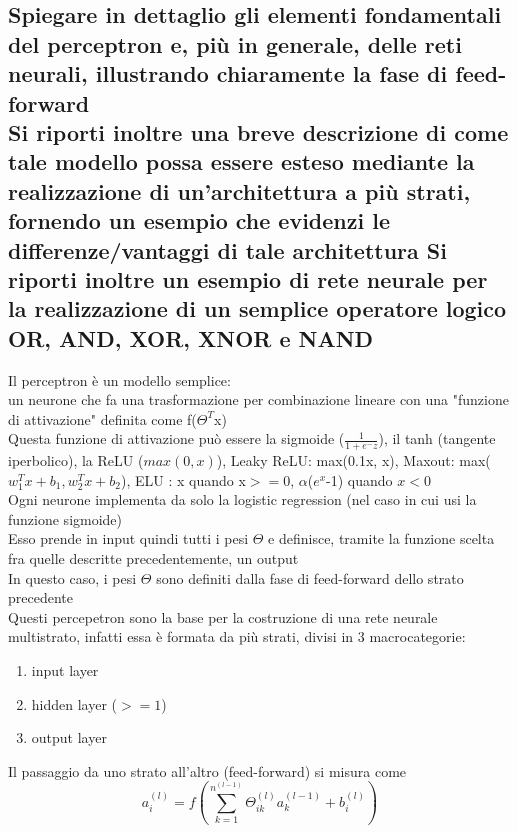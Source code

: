 \documentclass[10pt,oneside,a4paper]{article}
\begin{document}
	
	
	\subsection{Spiegare in dettaglio gli elementi fondamentali del perceptron e, più in generale, delle reti
		neurali, illustrando chiaramente la fase di feed-forward\\
		Si riporti inoltre una breve descrizione di come tale modello possa essere esteso
		mediante la realizzazione di un’architettura a più strati, fornendo un esempio che evidenzi
		le differenze/vantaggi di tale architettura
		Si riporti inoltre un esempio di rete neurale per la realizzazione di un semplice operatore
		logico OR, AND, XOR, XNOR e NAND}
	Il perceptron è un modello semplice:\\
	un neurone che fa una trasformazione per combinazione lineare con una "funzione di attivazione" definita come f($\Theta^T$x)\\
	Questa funzione di attivazione può essere la sigmoide ($\frac{1}{1+e^-z}$), il tanh (tangente iperbolico), la ReLU ($max(0,x)$), Leaky ReLU: max(0.1x, x), Maxout: max($w_1^Tx+b_1, w_2^Tx+b_2$), ELU : x quando x$>=0$, $\alpha$($e^x$-1) quando $x<0$\\
	Ogni neurone implementa da solo la logistic regression (nel caso in cui usi la funzione sigmoide)\\
	Esso prende in input quindi tutti i pesi $\Theta$ e definisce, tramite la funzione scelta fra quelle descritte precedentemente, un output\\
	In questo caso, i pesi $\Theta$ sono definiti dalla fase di feed-forward dello strato precedente\\
	Questi percepetron sono la base per la costruzione di una rete neurale multistrato, infatti essa è formata da più strati, divisi in 3 macrocategorie:
	\begin{enumerate}
		\item input layer
		\item hidden layer ($>=1$)
		\item output layer
	\end{enumerate}
	Il passaggio da uno strato all'altro (feed-forward) si misura come
	\[
	a_i^{(l)} = f\left(\sum_{k=1}^{n^{(l-1)}} \Theta_{ik}^{(l)} a_k^{(l-1)} + b_i^{(l)}\right)
	\]
	
\end{document}
